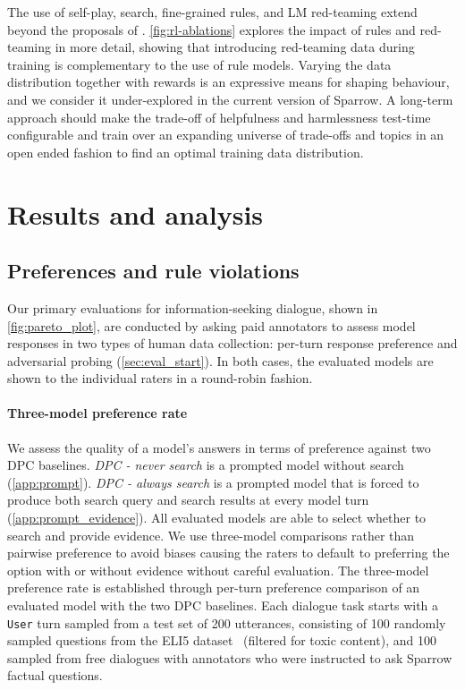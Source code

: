The use of self-play, search, fine-grained rules, and LM red-teaming extend beyond the proposals of \citet{bai2022training}.  \ref{fig:rl-ablations} explores the impact of rules and red-teaming in more detail, showing that introducing red-teaming data during training is complementary to the use of rule models. Varying the data distribution together with rewards is an expressive means for shaping behaviour, and we consider it under-explored in the current version of Sparrow. A long-term approach should make the trade-off of helpfulness and harmlessness test-time configurable \citep{abdolmaleki2020distributionalmompo} and train over an expanding universe of trade-offs and topics in an open ended fashion \citep{xland} to find an optimal training data distribution.

\section{Results and analysis} \label{sec:results}

\subsection{Preferences and rule violations} \label{sec:headlines}

Our primary evaluations for information-seeking dialogue, shown in \ref{fig:pareto_plot}, are conducted by asking paid annotators to assess model responses in two types of human data collection: per-turn response preference and adversarial probing (\ref{sec:eval_start}). In both cases, the evaluated models are shown to the individual raters in a round-robin fashion.

\paragraph{Three-model preference rate} We assess the quality of a model’s answers in terms of preference against two DPC baselines. \textit{DPC - never search} is a prompted model without search (\ref{app:prompt}). \textit{DPC - always search} is a prompted model that is forced to produce both search query and search results at every model turn (\ref{app:prompt_evidence}). All evaluated models are able to select whether to search and provide evidence. We use three-model comparisons rather than pairwise preference to avoid biases causing the raters to default to preferring the option with or without evidence without careful evaluation. The three-model preference rate is established through per-turn preference comparison of an evaluated model with the two DPC baselines. Each dialogue task starts with a \texttt{User} turn sampled from a test set of 200 utterances, consisting of 100 randomly sampled questions from the ELI5 dataset~\citep{eli5} (filtered for toxic content), and 100 sampled from free dialogues with annotators who were instructed to ask Sparrow factual questions.

